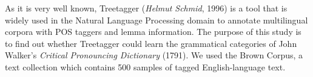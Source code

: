 As it is very well known, Treetagger (\textit{Helmut Schmid}, 1996) is a tool that is widely used in the Natural Language Processing domain to annotate multilingual corpora with POS taggers and lemma information. The purpose of this study is to find out whether Treetagger could learn the grammatical categories of John Walker's \textit{Critical Pronouncing Dictionary }(1791). We used the Brown Corpus, a text collection which contains 500 samples of tagged English-language text.